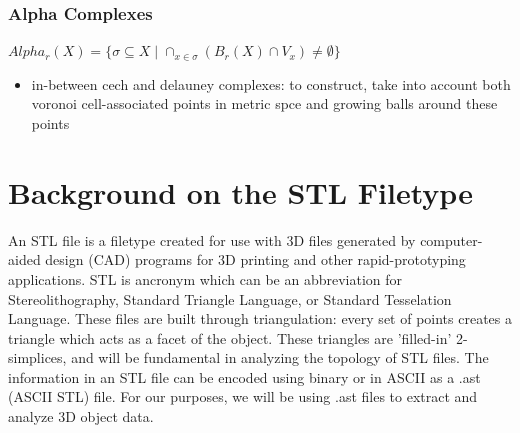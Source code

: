 \documentclass[ma]{uncgdissertationexp}
\theoremstyle{plain}
\theoremstyle{definition}
\theoremstyle{remark}
\begin{document}
\subsubsection{Alpha Complexes}
$Alpha_{r}(X)=\{\sigma \subseteq X \mid \cap_{x\in \sigma} (B_{r}(X) \cap V_{x}) \not= \emptyset\}$
\begin{itemize}
\item in-between cech and delauney complexes: to construct, take into account both voronoi cell-associated points in metric spce and growing balls around these points
\end{itemize}

\newpage
\section{Background on the STL Filetype}
An STL file is a filetype created for use with 3D files generated by computer-aided design (CAD) programs for 3D printing and other rapid-prototyping applications. STL is ancronym which can be an abbreviation for Stereolithography, Standard Triangle Language, or Standard Tesselation Language. These files are built through triangulation: every set of points creates a triangle which acts as a facet of the object. These triangles are 'filled-in' 2-simplices, and will be fundamental in analyzing the topology of STL files. The information in an STL file can be encoded using binary or in ASCII as a .ast (ASCII STL) file. For our purposes, we will be using .ast files to extract and analyze 3D object data. \cite{STL_info}
\end{document}
